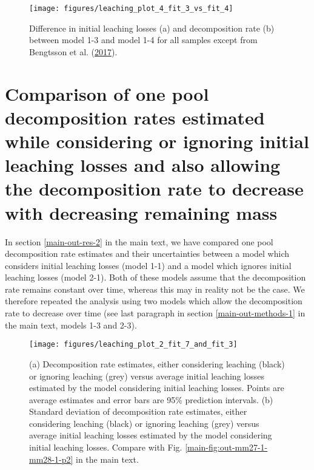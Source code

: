 \documentclass[
  12pt,
]{article}
\begin{document}
\begin{figure}[H]

{\centering \texttt{[image: figures/leaching\_plot\_4\_fit\_3\_vs\_fit\_4]} 

}

\caption{Difference in initial leaching losses (a) and decomposition rate (b) between model 1-3 and model 1-4 for all samples except from Bengtsson et al. (\protect\hyperlink{ref-Bengtsson.2017}{2017}).}\label{fig:sup-out-sdm-mm36-1-mm36-2-parameter-difference-p1-1}
\end{figure}

\hypertarget{sup-4}{%
\section{Comparison of one pool decomposition rates estimated while considering or ignoring initial leaching losses and also allowing the decomposition rate to decrease with decreasing remaining mass}\label{sup-4}}

In section \ref{main-out-res-2} in the main text, we have compared one pool decomposition rate estimates and their uncertainties between a model which considers initial leaching losses (model 1-1) and a model which ignores initial leaching losses (model 2-1). Both of these models assume that the decomposition rate remains constant over time, whereas this may in reality not be the case. We therefore repeated the analysis using two models which allow the decomposition rate to decrease over time (see last paragraph in section \ref{main-out-methods-1} in the main text, models 1-3 and 2-3).



\begin{figure}[H]

{\centering \texttt{[image: figures/leaching\_plot\_2\_fit\_7\_and\_fit\_3]} 

}

\caption{(a) Decomposition rate estimates, either considering leaching (black) or ignoring leaching (grey) versus average initial leaching losses estimated by the model considering initial leaching losses. Points are average estimates and error bars are 95\% prediction intervals. (b) Standard deviation of decomposition rate estimates, either considering leaching (black) or ignoring leaching (grey) versus average initial leaching losses estimated by the model considering initial leaching losses. Compare with Fig. \ref{main-fig:out-mm27-1-mm28-1-p2} in the main text.}\label{fig:sup-out-mm36-1-mm35-1-p3-1}
\end{figure}
\end{document}
